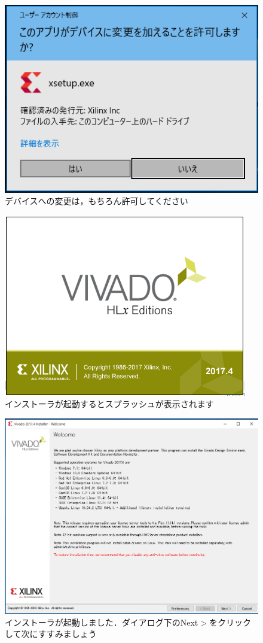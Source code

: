 \documentclass[a4paper,dvipdfmx]{jsarticle}
\begin{document}
 \begin{figure}[H]
  \begin{center}
   \includegraphics[width=.5\textwidth]{appendix_figures/06_installer_uac.png}
  \end{center}
  \caption{デバイスへの変更は，もちろん許可してください}
 \end{figure}

 \begin{figure}[H]
  \begin{center}
   \includegraphics[width=.5\textwidth]{appendix_figures/07_installer_splash.png}
  \end{center}
  \caption{インストーラが起動するとスプラッシュが表示されます}
 \end{figure}

 \begin{figure}[H]
  \begin{center}
   \includegraphics[width=.8\textwidth]{appendix_figures/08_installer_main.png}
  \end{center}
  \caption{インストーラが起動しました．ダイアログ下のNext$\gt$をクリックして次にすすみましょう}
 \end{figure}
\end{document}
